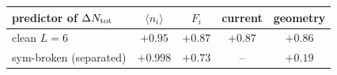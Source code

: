 \begin{tabular}{lcccc}
\toprule
predictor of $\Delta N_{\rm tot}$ & $\langle n_i\rangle$ & $F_i$ & current & geometry \\
\midrule
clean $L=6$ & $+0.95$ & $+0.87$ & $+0.87$ & $+0.86$ \\
sym-broken (separated) & $+0.998$ & $+0.73$ & -- & $+0.19$ \\
\bottomrule
\end{tabular}
